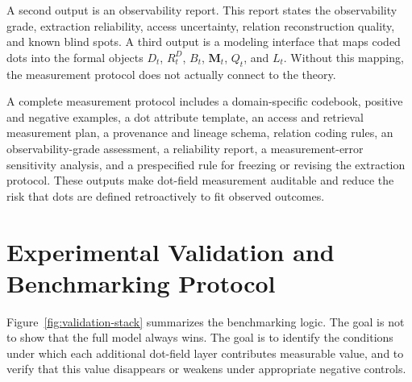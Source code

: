 \documentclass[11pt]{article}
\theoremstyle{remark}
\begin{document}
A second output is an observability report. This report states the observability grade, extraction reliability, access uncertainty, relation reconstruction quality, and known blind spots. A third output is a modeling interface that maps coded dots into the formal objects $D_t$, $R_t^D$, $B_t$, $\mathbf M_t$, $Q_t$, and $L_t$. Without this mapping, the measurement protocol does not actually connect to the theory.


A complete measurement protocol includes a domain-specific codebook,
positive and negative examples, a dot attribute template, an access and
retrieval measurement plan, a provenance and lineage schema, relation
coding rules, an observability-grade assessment, a reliability report, a
measurement-error sensitivity analysis, and a prespecified rule for
freezing or revising the extraction protocol. These outputs make dot-field
measurement auditable and reduce the risk that dots are defined
retroactively to fit observed outcomes.

\section{Experimental Validation and Benchmarking Protocol}\label{experimental-validation-and-benchmarking-protocol}

Figure~\ref{fig:validation-stack} summarizes the benchmarking logic. The goal is not to show that the full model always wins. The goal is to identify the conditions under which each additional dot-field layer contributes measurable value, and to verify that this value disappears or weakens under appropriate negative controls.
\end{document}

